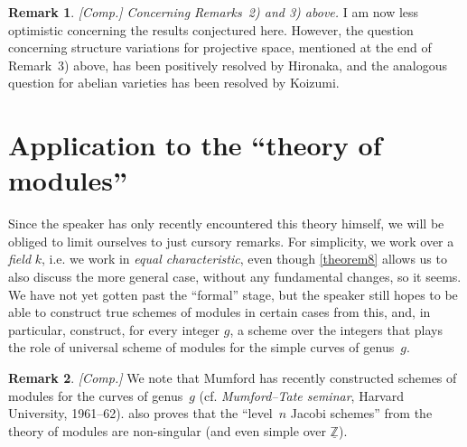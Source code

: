 \documentclass{article}
\theoremstyle{plain}
\theoremstyle{definition}
\newtheorem*{remark}{Remark}
\newcommand{\ZZ}{\mathbb{Z}}
\newcommand{\oldpage}[1]{\marginpar{\footnotesize$\Big\vert$ \textit{p.~#1}}}
\begin{document}
\begin{remark}
  \emph{[Comp.] Concerning Remarks~2) and 3) above.}
  I am now less optimistic concerning the results conjectured here.
  However, the question concerning structure variations for projective space, mentioned at the end of Remark~3) above, has been positively resolved by Hironaka, and the analogous question for abelian varieties has been resolved by Koizumi.
\end{remark}


\section{Application to the ``theory of modules''}
\label{section7}

Since the speaker has only recently encountered this theory himself, we will be obliged to limit ourselves to just cursory remarks.
For simplicity, we work over a \emph{field} $k$, i.e. we work in \emph{equal characteristic}, even though \cref{theorem8} allows us to also discuss the more general case, without any fundamental changes, so it seems.
We have not yet gotten past the ``formal'' stage, but the speaker still hopes to be able to construct true schemes of modules
\oldpage{182-16}
in certain cases from this, and, in particular, construct, for every integer $g$, a scheme over the integers that plays the role of universal scheme of modules for the simple curves of genus~$g$.

\begin{remark}
  \emph{[Comp.]}
  We note that Mumford has recently constructed schemes of modules for the curves of genus~$g$ (cf. \emph{Mumford--Tate seminar}, Harvard University, 1961--62).
   also proves that the ``level~$n$ Jacobi schemes'' from the theory of modules are non-singular (and even simple over $\underline{\ZZ}$).
\end{remark}
\end{document}
